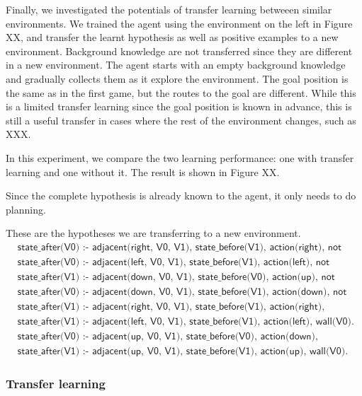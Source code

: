 Finally, we investigated the potentials of transfer learning betweeen similar environments.
We trained the agent using the environment on the left in Figure XX, and transfer the learnt hypothesis as well as positive examples to a new environment.
Background knowledge are not transferred since they are different in a new environment. The agent starts with an empty background knowledge and gradually collects them
as it explore the environment. 
The goal position is the same as in the first game, but the routes to the goal are different.
While this is a limited transfer learning since the goal position is known in advance, this is still a useful transfer in cases where the rest of the environment changes,
such as XXX.

In this experiment, we compare the two learning performance: one with transfer learning and one without it. 
The result is shown in Figure XX.

Since the complete hypothesis is already known to the agent, it only needs to do planning. 

These are the hypotheses we are transferring to a new environment.
\begin{equation*}
\begin{split}
 &\textsf{state\_after(V0) :- adjacent(right, V0, V1), state\_before(V1), action(right), not wall(V0).}\\
 &\textsf{state\_after(V0) :- adjacent(left, V0, V1), state\_before(V1), action(left), not wall(V0).}\\
 &\textsf{state\_after(V1) :- adjacent(down, V0, V1), state\_before(V0), action(up), not wall(V1).}\\
 &\textsf{state\_after(V0) :- adjacent(down, V0, V1), state\_before(V1), action(down), not wall(V0).}\\
 &\textsf{state\_after(V1) :- adjacent(right, V0, V1), state\_before(V1), action(right), wall(V0).}\\
 &\textsf{state\_after(V1) :- adjacent(left, V0, V1), state\_before(V1), action(left), wall(V0).}\\
 &\textsf{state\_after(V0) :- adjacent(up, V0, V1), state\_before(V0), action(down), wall(V1).}\\
 &\textsf{state\_after(V1) :- adjacent(up, V0, V1), state\_before(V1), action(up), wall(V0).}
\end{split}
\end{equation*}

\subsubsection{Transfer learning}

